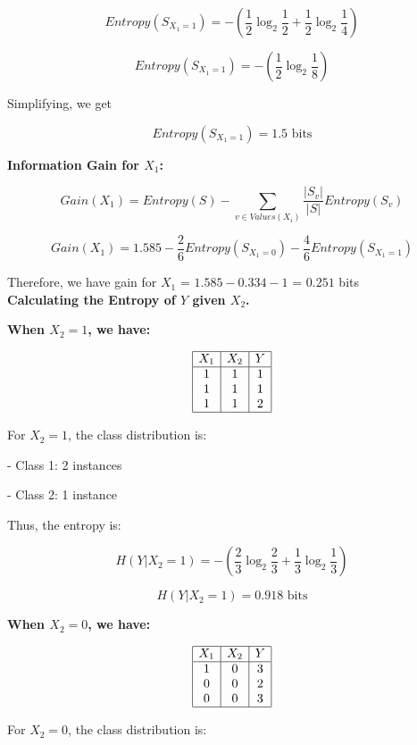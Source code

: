 \documentclass[12pt]{article}
\begin{document}
\[
  Entropy(S_{X_1=1}) = -\left( \frac{1}{2} \log_2 \frac{1}{2} + \frac{1}{2} \log_2 \frac{1}{4} \right)
\]

\[
  Entropy(S_{X_1=1}) = -\left( \frac{1}{2} \log_2 \frac{1}{8} \right)
\]

Simplifying, we get

\[
  Entropy(S_{X_1=1}) = 1.5 \text{ bits}
\]


\textbf{Information Gain for $X_1$:}

\[
  Gain(X_1) = Entropy(S) - \sum_{v \in Values(X_i)}^{} \frac{|S_v|}{|S|} Entropy(S_v)
\]

\[
  Gain(X_1) = 1.585 - \frac{2}{6} Entropy(S_{X_1=0}) - \frac{4}{6} Entropy(S_{X_1=1})
\]

Therefore, we have gain for $X_1$ = $1.585 - 0.334 - 1$ = $0.251$ bits \\[1em]

\textbf{Calculating the Entropy of $Y$ given $X_2$.}

\textbf{When $X_2 = 1$, we have:}

\[
  \begin{array}{|c|c|c|}
    \hline
    X_1 & X_2 & Y \\
    \hline
    1   & 1   & 1 \\
    1   & 1   & 1 \\
    1   & 1   & 2 \\
    \hline
  \end{array}
\]

For $X_2 = 1$, the class distribution is:

- Class 1: 2 instances

- Class 2: 1 instance

Thus, the entropy is:

\[
  H(Y|X_2 = 1) = -\left( \frac{2}{3} \log_2 \frac{2}{3} + \frac{1}{3} \log_2 \frac{1}{3} \right)
\]

\[
  H(Y|X_2 = 1) = 0.918 \text{ bits}
\]

\textbf{When $X_2 = 0$, we have:}

\[
  \begin{array}{|c|c|c|}
    \hline
    X_1 & X_2 & Y \\
    \hline
    1   & 0   & 3 \\
    0   & 0   & 2 \\
    0   & 0   & 3 \\
    \hline
  \end{array}
\]

For $X_2 = 0$, the class distribution is:
\end{document}

